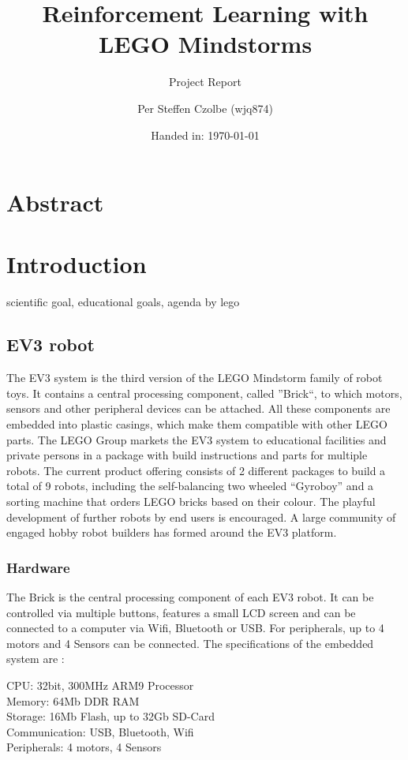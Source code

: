 \documentclass[11pt, a4paper]{article}
\author{Per Steffen Czolbe (wjq874)}
\title{Reinforcement Learning with LEGO Mindstorms}
\subtitle{Project Report}
\date{Handed in: \today}
\begin{document}
\maketitle

\section{Abstract}

\tableofcontents


\section{Introduction}
scientific goal,
educational goals,
agenda by lego

\subsection{EV3 robot}
The EV3 system is the third version of the LEGO Mindstorm family of robot toys. It contains a central processing component, called ''Brick``, to which motors, sensors and other peripheral devices can be attached. All these components are embedded into plastic casings, which make them compatible with other LEGO parts. The LEGO Group markets the EV3 system to educational facilities and private persons in a package with build instructions and parts for multiple robots. The current product offering consists of 2 different packages to build a total of 9 robots, including the self-balancing two wheeled ``Gyroboy'' and a sorting machine that orders LEGO bricks based on their colour. The playful development of further robots by end users is encouraged. A large community of engaged hobby robot builders has formed around the EV3 platform.

\subsubsection*{Hardware}
The Brick is the central processing component of each EV3 robot. It can be controlled via multiple buttons, features a small LCD screen and can be connected to a computer via Wifi, Bluetooth or USB. For peripherals, up to 4 motors and 4 Sensors can be connected. The specifications of the embedded system are \cite{ev3_dev_toolkit}:
\begin{listing}
	CPU: 32bit, 300MHz ARM9 Processor \\
	Memory: 64Mb DDR RAM\\
	Storage: 16Mb Flash, up to 32Gb SD-Card \\
	Communication: USB, Bluetooth, Wifi \\
	Peripherals: 4 motors, 4 Sensors
\end{listing}
\end{document}
